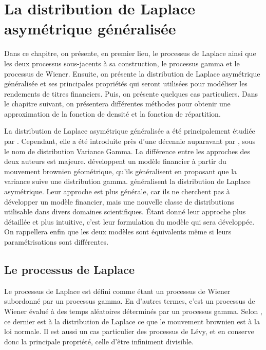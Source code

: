 \chapter{La distribution de Laplace asymétrique
  généralisée} %

Dans ce chapitre, on présente, en premier lieu, le processus de
Laplace ainsi que les deux processus sous-jacents à sa construction,
le processus gamma et le processus de Wiener. Ensuite, on présente la
distribution de Laplace asymétrique généralisée et ses principales
propriétés qui seront utilisées pour modéliser les rendements de
titres financiers. Puis, on présente quelques cas particuliers.  Dans
le chapitre suivant, on présentera différentes méthodes pour obtenir
une approximation de la fonction de densité et la fonction de
répartition.

La distribution de Laplace asymétrique généralisée a été
principalement étudiée par \cite{kozubowski1999class}. Cependant, elle
a été introduite près d'une décennie auparavant par
\cite{madan1990variance}, sous le nom de distribution Variance
Gamma. La différence entre les approches des deux auteurs est
majeure. \cite{madan1990variance} développent un modèle financier à
partir du mouvement brownien géométrique, qu'ils généralisent en
proposant que la variance suive une distribution
gamma. \cite{kozubowski1999class} généralisent la distribution de
Laplace asymétrique. Leur approche est plus générale, car ils ne
cherchent pas à développer un modèle financier, mais une nouvelle
classe de distributions utilisable dans divers domaines
scientifiques. Étant donné leur approche plus détaillée et plus
intuitive, c'est leur formulation du modèle qui sera développée. On
rappellera enfin que les deux modèles sont équivalents même si leurs
paramétrisations sont différentes.

\section{Le processus de Laplace}
\label{sec:processusGAL}

Le processus de Laplace est défini comme étant un processus de Wiener
subordonné par un processus gamma. En d'autres termes, c'est un
processus de Wiener évalué à des temps aléatoires déterminés par un
processus gamma. Selon \cite{kotz2001laplace}, ce dernier est à la
distribution de Laplace ce que le mouvement brownien est à la loi
normale. Il est aussi un cas particulier des processus de Lévy, et en
conserve donc la principale propriété, celle d'être infiniment
divisible.

